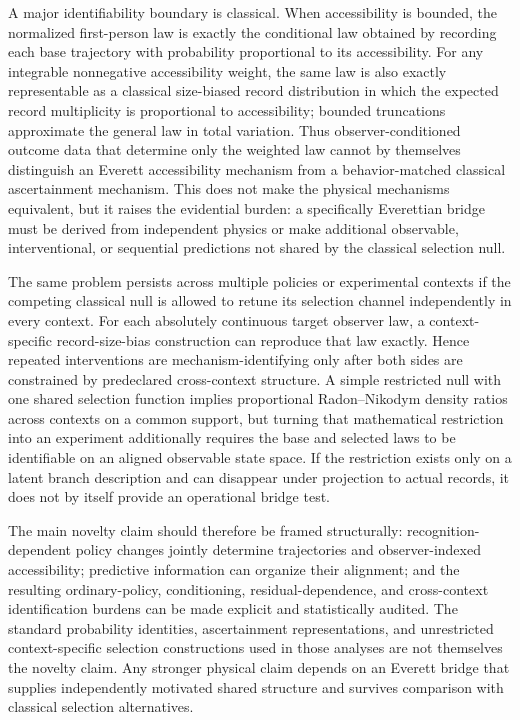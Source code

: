 A major identifiability boundary is classical. When accessibility is bounded, the normalized first-person law is exactly the conditional law obtained by recording each base trajectory with probability proportional to its accessibility. For any integrable nonnegative accessibility weight, the same law is also exactly representable as a classical size-biased record distribution in which the expected record multiplicity is proportional to accessibility; bounded truncations approximate the general law in total variation. Thus observer-conditioned outcome data that determine only the weighted law cannot by themselves distinguish an Everett accessibility mechanism from a behavior-matched classical ascertainment mechanism. This does not make the physical mechanisms equivalent, but it raises the evidential burden: a specifically Everettian bridge must be derived from independent physics or make additional observable, interventional, or sequential predictions not shared by the classical selection null.

The same problem persists across multiple policies or experimental contexts if the competing classical null is allowed to retune its selection channel independently in every context. For each absolutely continuous target observer law, a context-specific record-size-bias construction can reproduce that law exactly. Hence repeated interventions are mechanism-identifying only after both sides are constrained by predeclared cross-context structure. A simple restricted null with one shared selection function implies proportional Radon--Nikodym density ratios across contexts on a common support, but turning that mathematical restriction into an experiment additionally requires the base and selected laws to be identifiable on an aligned observable state space. If the restriction exists only on a latent branch description and can disappear under projection to actual records, it does not by itself provide an operational bridge test.

The main novelty claim should therefore be framed structurally: recognition-dependent policy changes jointly determine trajectories and observer-indexed accessibility; predictive information can organize their alignment; and the resulting ordinary-policy, conditioning, residual-dependence, and cross-context identification burdens can be made explicit and statistically audited. The standard probability identities, ascertainment representations, and unrestricted context-specific selection constructions used in those analyses are not themselves the novelty claim. Any stronger physical claim depends on an Everett bridge that supplies independently motivated shared structure and survives comparison with classical selection alternatives.
